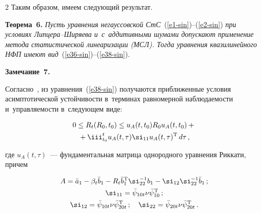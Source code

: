 \begin{multicols}{2}
Таким образом, имеем следующий результат.



\smallskip



\noindent

\textbf{Теорема~6.} \textit{Пусть уравнения негауссовской СтС}~(\ref{e1-sin})--(\ref{e2-sin}) \textit{при условиях Лип\-це\-ра--Ши\-ря\-ева и~с~аддитивными шумами  допускают применение метода статистической линеаризации (МСЛ). Тогда уравнения  квазилинейного НФП имеют вид}~(\ref{e36-sin})--(\ref{e38-sin}).



\smallskip



\noindent

\textbf{Замечание~7.}

Согласно~\cite{2-sin, 3-sin}, из уравнения~(\ref{e38-sin}) получаются приближенные условия асимптотической устойчивости в~терминах равномерной наблюда\-емости и~управляемости в~следующем виде:

    \begin{multline*}

    0\le R_t (R_0, t_0) \le u_A (t, t_0) R_0 u_A(t, t_0) +{}\\

     {}+\iii_{t_0}^t u_A (t,\tau) \si_{11} u_A (t, \tau)^{\mathrm{T}}\, d\tau\,,


    \end{multline*}

где $u_A (t,\tau)$~--- фундаментальная матрица однородного уравнения Риккати, причем

   \begin{gather*}

    A =\bar a_1 -\beta_t \bar b_1 - R_t \bar b_1^{\mathrm{T}} \si_{22}^{-1} b_1- \si_{12} \si_{22}^{-1} \bar b_1\,; %

    \\

    \si_{11}= \bar\psi_{10t}\nu\bar\psi_{10}^{\mathrm{T}}\,;\\

     \si_{12}= \bar\psi_{10 t}\nu\bar\psi_{20t}^{\mathrm{T}}\,;\quad

      \si_{22} = \bar\psi_{20t}\nu\bar\psi_{20t}^{\mathrm{T}}\,.\label{e41-sin}

    \end{gather*}




\end{multicols}
